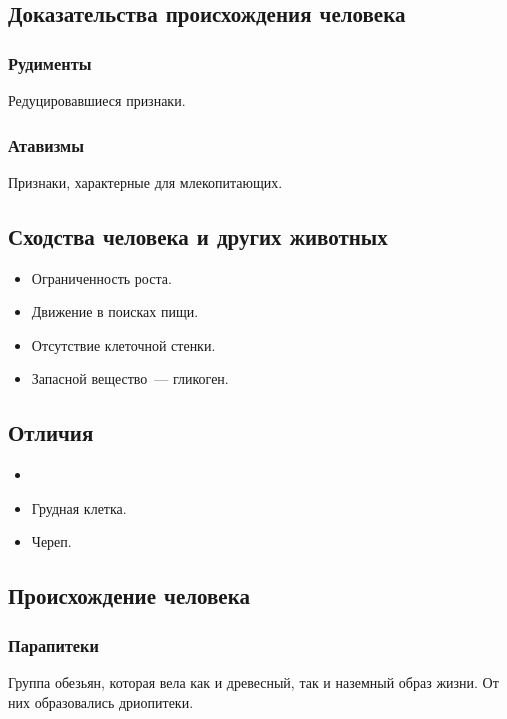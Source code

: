 \documentclass[12pt]{article}
\begin{document}
	\subsection{Доказательства происхождения человека}
	
	\subsubsection{Рудименты}
	
	Редуцировавшиеся признаки.
	
	\subsubsection{Атавизмы}
	
	Признаки, характерные для млекопитающих.
	
	\subsection{Сходства человека и других животных}
	
	\begin{itemize}
		\item Ограниченность роста.
		\item Движение в поисках пищи.
		\item Отсутствие клеточной стенки.
		\item Запасной вещество~--- гликоген.
	\end{itemize}
	
	\subsection{Отличия}
	
	\begin{itemize}
		\item 
		\item Грудная клетка.
		\item Череп.
	\end{itemize}
	
	\subsection{Происхождение человека}
	
	\subsubsection{Парапитеки}
	
	Группа обезьян, которая вела как и древесный, так и наземный образ жизни. От них образовались дриопитеки.
	
\end{document}
